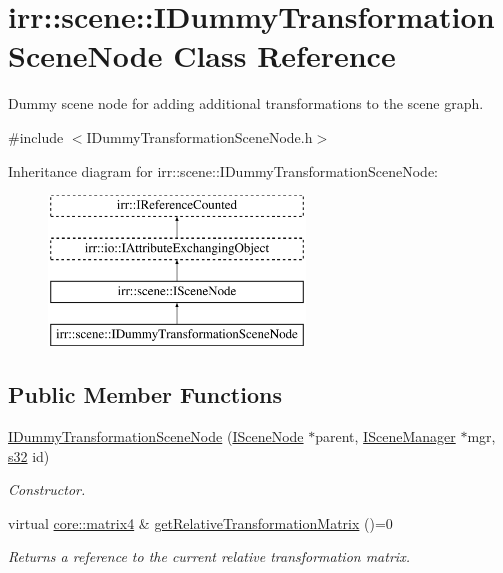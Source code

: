 \hypertarget{classirr_1_1scene_1_1IDummyTransformationSceneNode}{}\section{irr\+:\+:scene\+:\+:I\+Dummy\+Transformation\+Scene\+Node Class Reference}
\label{classirr_1_1scene_1_1IDummyTransformationSceneNode}


Dummy scene node for adding additional transformations to the scene graph.  




{\ttfamily \#include $<$I\+Dummy\+Transformation\+Scene\+Node.\+h$>$}

Inheritance diagram for irr\+:\+:scene\+:\+:I\+Dummy\+Transformation\+Scene\+Node\+:\begin{figure}[H]
\begin{center}
\leavevmode
\includegraphics[height=4.000000cm]{classirr_1_1scene_1_1IDummyTransformationSceneNode}
\end{center}
\end{figure}
\subsection*{Public Member Functions}
\begin{DoxyCompactItemize}
\item 
\mbox{\label{classirr_1_1scene_1_1IDummyTransformationSceneNode_a542c82a6fb76e99ea9773b974363fab1}} 
\hyperlink{classirr_1_1scene_1_1IDummyTransformationSceneNode_a542c82a6fb76e99ea9773b974363fab1}{I\+Dummy\+Transformation\+Scene\+Node} (\hyperlink{classirr_1_1scene_1_1ISceneNode}{I\+Scene\+Node} $\ast$parent, \hyperlink{classirr_1_1scene_1_1ISceneManager}{I\+Scene\+Manager} $\ast$mgr, \hyperlink{namespaceirr_ac66849b7a6ed16e30ebede579f9b47c6}{s32} id)
\begin{DoxyCompactList}\small\item\em Constructor. \end{DoxyCompactList}\item 
virtual \hyperlink{namespaceirr_1_1core_a73fa92e638c5ca97efd72da307cc9b65}{core\+::matrix4} \& \hyperlink{classirr_1_1scene_1_1IDummyTransformationSceneNode_a95612d8bb225213c907fbf5a2606f0d3}{get\+Relative\+Transformation\+Matrix} ()=0
\begin{DoxyCompactList}\small\item\em Returns a reference to the current relative transformation matrix. \end{DoxyCompactList}\end{DoxyCompactItemize}
